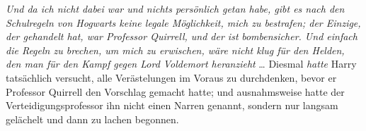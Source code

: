 \emph{Und da ich nicht dabei war und nichts persönlich getan habe, gibt es nach den Schulregeln von Hogwarts keine legale Möglichkeit, mich zu bestrafen; der Einzige, der gehandelt hat, war Professor Quirrell, und der ist} \emph{bombensicher. Und einfach die Regeln zu brechen, um mich zu erwischen, wäre nicht klug für den Helden, den man für den Kampf gegen Lord Voldemort heranzieht} … Diesmal \emph{hatte} Harry tatsächlich versucht, alle Verästelungen im Voraus zu durchdenken, bevor er Professor Quirrell den Vorschlag gemacht hatte; und ausnahmsweise hatte der Verteidigungsprofessor ihn nicht einen Narren genannt, sondern nur langsam gelächelt und dann zu lachen begonnen.

